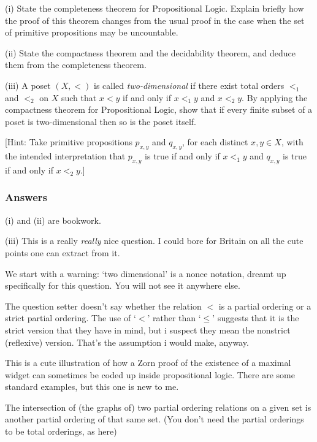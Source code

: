\documentclass{book}
\begin{document}
(i) State the completeness theorem for Propositional Logic.  Explain briefly
how the proof of this theorem changes from the usual proof in the case
when the set of primitive propositions may be uncountable.

\noindent (ii) State the compactness theorem and the decidability
theorem, and deduce them from the completeness theorem.

\noindent (iii) A poset $(X,<)$ is called {\sl two-dimensional} if there exist
total orders $<_1$ and $<_2$ on $X$ such that $x < y$ if and only if
$x <_1y$ and $x <_2y$. By applying the compactness theorem for
Propositional Logic, show that if every finite subset of a poset is
two-dimensional then so is the poset itself.

[Hint: Take primitive propositions $p_{x,y}$ and $q_{x,y}$, for each distinct
  $x,y \in X$, with the intended interpretation that $p_{x,y}$ is true if
  and only if $x <_1y$ and $q_{x,y}$ is true if and only if $x <_2y$.]

\subsubsection*{Answers}

(i) and (ii) are bookwork.

\smallskip

\noindent (iii) This is a really {\sl really} nice question.  I could bore
for Britain on all the cute points one can extract from it.

\smallskip

We start with a warning: `two dimensional' is a nonce notation, dreamt
up specifically for this question.  You will not see it anywhere else.

The question setter doesn't say whether the relation $<$ is a partial
ordering or a strict partial ordering.  The use of `$<$' rather than
`$\leq$' suggests that it is the strict version that they have in mind,
but i suspect they mean the nonstrict (reflexive) version.  That's the
assumption i would make, anyway.

This is a cute illustration of how a Zorn proof of the existence
of a maximal widget can sometimes be coded up inside propositional
logic. There are some standard examples, but this one is new to me.


The intersection of (the graphs of) two partial ordering relations
on a given set is another partial ordering of that same set. (You
don't need the partial orderings to be total orderings, as here)
\end{document}
